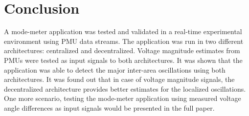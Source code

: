 \documentclass[conference]{IEEEtran}
\begin{document}
\section{Conclusion} \label{conclusion}
A mode-meter application was tested and validated in a real-time experimental environment using PMU data streams. The application was run in two different architectures: centralized and decentralized. Voltage magnitude estimates from PMUs were tested as input signals to both architectures.  It was shown that the application was able to detect the major inter-area oscillations using both architectures.  It was found out that in case of voltage magnitude signals, the decentralized architecture provides better estimates for the localized oscillations. One more scenario, testing the mode-meter  application using measured voltage angle differences as input signals would be presented in the full paper. 

\end{document}
